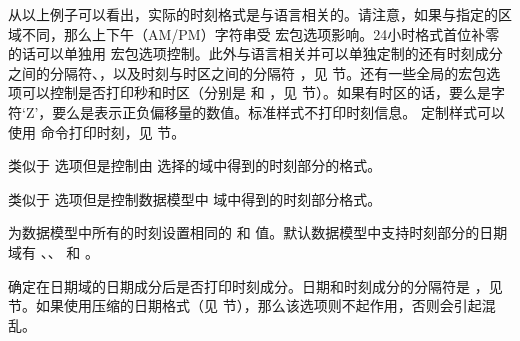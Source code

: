 \begin{optionlist}
从以上例子可以看出，实际的时刻格式是与语言相关的。请注意，如果与指定的区域不同，那么上下午（AM/PM）字符串受  宏包选项影响。24小时格式首位补零的话可以单独用  宏包选项控制。此外与语言相关并可以单独定制的还有时刻成分之间的分隔符、，以及时刻与时区之间的分隔符 ，见  节。还有一些全局的宏包选项可以控制是否打印秒和时区（分别是  和 ，见  节）。如果有时区的话，要么是字符`Z'，要么是表示正负偏移量的数值。标准样式不打印时刻信息。
定制样式可以使用  命令打印时刻，见  节。


类似于  选项但是控制由  选择的域中得到的时刻部分的格式。


类似于  选项但是控制数据模型中  域中得到的时刻部分格式。


为数据模型中所有的时刻设置相同的  和  值。默认数据模型中支持时刻部分的日期域有 、、 和 。


确定在日期域的日期成分后是否打印时刻成分。日期和时刻成分的分隔符是  ，见  节。如果使用压缩的日期格式（见   节），那么该选项则不起作用，否则会引起混乱。


\end{optionlist}
